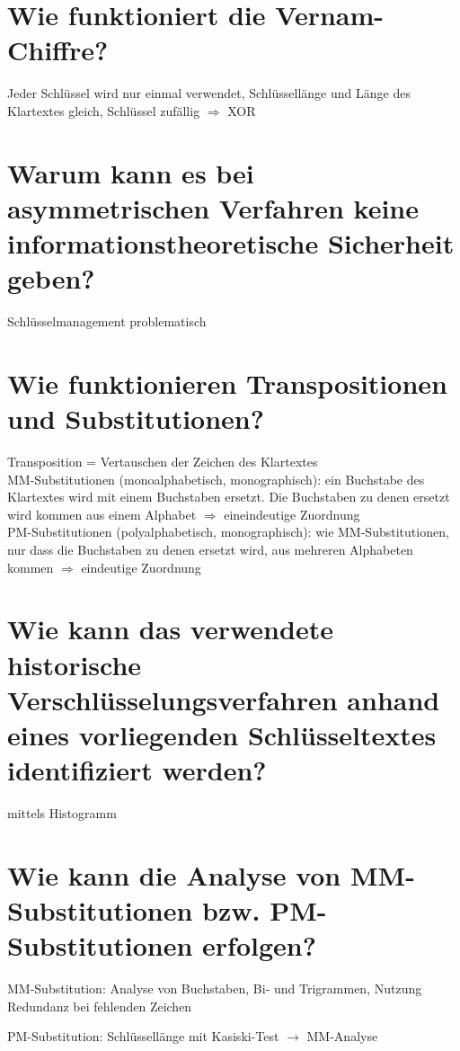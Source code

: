 \documentclass{article}
\begin{document}
	\section*{Wie funktioniert die Vernam-Chiffre?}
	Jeder Schlüssel wird nur einmal verwendet, Schlüssellänge und Länge des Klartextes gleich, Schlüssel zufällig $\Rightarrow$ XOR
	
	\section*{Warum kann es bei asymmetrischen Verfahren keine informationstheoretische Sicherheit geben?}
	Schlüsselmanagement problematisch
	
	\section*{Wie funktionieren Transpositionen und Substitutionen?}
	Transposition = Vertauschen der Zeichen des Klartextes \\
	MM-Substitutionen (monoalphabetisch, monographisch): ein Buchstabe des Klartextes wird mit einem Buchstaben ersetzt. Die Buchstaben zu denen ersetzt wird kommen aus einem Alphabet $\Rightarrow$ eineindeutige Zuordnung \\
	PM-Substitutionen (polyalphabetisch, monographisch): wie MM-Substitutionen, nur dass die Buchstaben zu denen ersetzt wird, aus mehreren Alphabeten kommen $\Rightarrow$ eindeutige Zuordnung
	
	\section*{Wie kann das verwendete historische Verschlüsselungsverfahren anhand eines vorliegenden Schlüsseltextes identifiziert werden?}
	mittels Histogramm
	
	\section*{Wie kann die Analyse von MM-Substitutionen bzw. PM-Substitu\-tionen erfolgen?}
	MM-Substitution: Analyse von Buchstaben, Bi- und Trigrammen, Nutzung Redundanz bei fehlenden Zeichen
	
	PM-Substitution: Schlüssellänge mit Kasiski-Test $\to$ MM-Analyse
	
\end{document}
